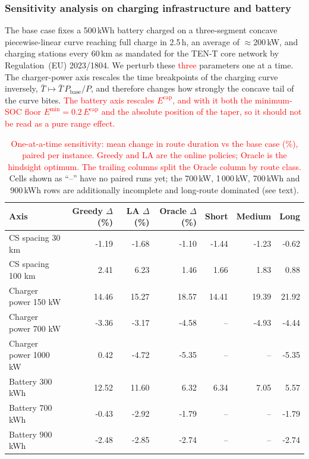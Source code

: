 \documentclass[preprint,12pt,3p]{elsarticle}
\newcommand{\red}[1]{\textcolor{red}{#1}}
\newcommand{\blue}[1]{{\color{darkblue}#1}}
\begin{document}
\subsubsection{Sensitivity analysis on charging infrastructure and battery}
\label{sec:sensitivity}

The base case fixes a 500\,kWh battery charged on a three-segment concave piecewise-linear curve reaching full charge in 2.5\,h, an average of $\approx$200\,kW, and charging stations every 60\,km as mandated for the TEN-T core network by Regulation~(EU) 2023/1804.  We perturb these \red{three} parameters one at a time.
The charger-power axis rescales the time breakpoints of the charging curve inversely, $\bar{T} \mapsto \bar{T}\,P_{\mathrm{base}}/P$, and therefore changes how strongly the concave tail of the curve bites. \red{The battery axis rescales $E^{\mathrm{cap}}$, and with it both the minimum-SOC floor $E^{\min} = 0.2\,E^{\mathrm{cap}}$ and the absolute position of the taper, so it should not be read as a pure range effect.}

\begin{table}[ht]\centering
\caption{\red{One-at-a-time sensitivity: mean change in route duration vs the base case (\%), paired per instance.  Greedy and LA are the online policies; Oracle is the hindsight optimum.  The trailing columns split the Oracle column by route class.}  \blue{Cells shown as ``--'' have no paired runs yet; the 700\,kW, 1\,000\,kW, 700\,kWh and 900\,kWh rows are additionally incomplete and long-route dominated (see text).}}
\label{tab:sensitivity}
\begin{tabular}{lrrrrrr}
\hline
Axis & Greedy $\Delta$ (\%) & LA $\Delta$ (\%) & Oracle $\Delta$ (\%) & Short & Medium & Long \\
\hline
CS spacing 30 km & -1.19 & -1.68 & -1.10 & -1.44 & -1.23 & -0.62 \\
CS spacing 100 km & 2.41 & 6.23 & 1.46 & 1.66 & 1.83 & 0.88 \\
Charger power 150 kW & 14.46 & 15.27 & 18.57 & 14.41 & 19.39 & 21.92 \\
Charger power 700 kW & -3.36 & -3.17 & -4.58 & \blue{--} & \blue{-4.93} & -4.44 \\
Charger power 1000 kW & 0.42 & -4.72 & -5.35 & \blue{--} & \blue{--} & \blue{-5.35} \\
Battery 300 kWh & 12.52 & 11.60 & 6.32 & 6.34 & 7.05 & 5.57 \\
Battery 700 kWh & -0.43 & -2.92 & -1.79 & \blue{--} & \blue{--} & \blue{-1.79} \\
Battery 900 kWh & -2.48 & -2.85 & -2.74 & \blue{--} & \blue{--} & \blue{-2.74} \\
\hline
\end{tabular}
\end{table}
\end{document}
